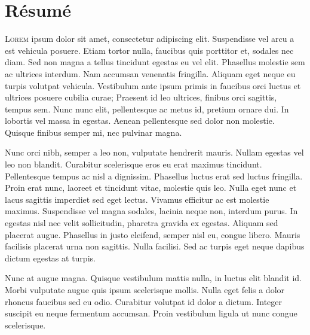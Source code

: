 \chapter*{Résumé}
{\fontsize{11.45pt}{13.5pt}\selectfont 
\lettrine[lines=2]{L}{orem} ipsum dolor sit amet, consectetur adipiscing elit. Suspendisse vel arcu a est vehicula posuere. Etiam tortor nulla, faucibus quis porttitor et, sodales nec diam. Sed non magna a tellus tincidunt egestas eu vel elit. Phasellus molestie sem ac ultrices interdum. Nam accumsan venenatis fringilla. Aliquam eget neque eu turpis volutpat vehicula. Vestibulum ante ipsum primis in faucibus orci luctus et ultrices posuere cubilia curae; Praesent id leo ultrices, finibus orci sagittis, tempus sem. Nunc nunc elit, pellentesque ac metus id, pretium ornare dui. In lobortis vel massa in egestas. Aenean pellentesque sed dolor non molestie. Quisque finibus semper mi, nec pulvinar magna.

Nunc orci nibh, semper a leo non, vulputate hendrerit mauris. Nullam egestas vel leo non blandit. Curabitur scelerisque eros eu erat maximus tincidunt. Pellentesque tempus ac nisl a dignissim. Phasellus luctus erat sed luctus fringilla. Proin erat nunc, laoreet et tincidunt vitae, molestie quis leo. Nulla eget nunc et lacus sagittis imperdiet sed eget lectus. Vivamus efficitur ac est molestie maximus. Suspendisse vel magna sodales, lacinia neque non, interdum purus. In egestas nisl nec velit sollicitudin, pharetra gravida ex egestas. Aliquam sed placerat augue. Phasellus in justo eleifend, semper nisl eu, congue libero. Mauris facilisis placerat urna non sagittis. Nulla facilisi. Sed ac turpis eget neque dapibus dictum egestas at turpis.

Nunc at augue magna. Quisque vestibulum mattis nulla, in luctus elit blandit id. Morbi vulputate augue quis ipsum scelerisque mollis. Nulla eget felis a dolor rhoncus faucibus sed eu odio. Curabitur volutpat id dolor a dictum. Integer suscipit eu neque fermentum accumsan. Proin vestibulum ligula ut nunc congue scelerisque.
}

{}
\setcounter{tocdepth}{2}
\dominitoc
\tableofcontents



